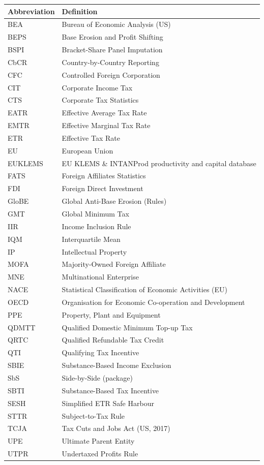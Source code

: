\documentclass[11pt,a4paper]{article}
\begin{document}
\begin{tabular}{@{}ll@{}}
  \toprule
  \textbf{Abbreviation} & \textbf{Definition} \\
  \midrule
  BEA & Bureau of Economic Analysis (US) \\
  BEPS & Base Erosion and Profit Shifting \\
  BSPI & Bracket-Share Panel Imputation \\
  CbCR & Country-by-Country Reporting \\
  CFC & Controlled Foreign Corporation \\
  CIT & Corporate Income Tax \\
  CTS & Corporate Tax Statistics \\
  EATR & Effective Average Tax Rate \\
  EMTR & Effective Marginal Tax Rate \\
  ETR & Effective Tax Rate \\
  EU & European Union \\
  EUKLEMS & EU KLEMS \& INTANProd productivity and capital database \\
  FATS & Foreign Affiliates Statistics \\
  FDI & Foreign Direct Investment \\
  GloBE & Global Anti-Base Erosion (Rules) \\
  GMT & Global Minimum Tax \\
  IIR & Income Inclusion Rule \\
  IQM & Interquartile Mean \\
  IP & Intellectual Property \\
  MOFA & Majority-Owned Foreign Affiliate \\
  MNE & Multinational Enterprise \\
  NACE & Statistical Classification of Economic Activities (EU) \\
  OECD & Organisation for Economic Co-operation and Development \\
  PPE & Property, Plant and Equipment \\
  QDMTT & Qualified Domestic Minimum Top-up Tax \\
  QRTC & Qualified Refundable Tax Credit \\
  QTI & Qualifying Tax Incentive \\
  SBIE & Substance-Based Income Exclusion \\
  SbS & Side-by-Side (package) \\
  SBTI & Substance-Based Tax Incentive \\
  SESH & Simplified ETR Safe Harbour \\
  STTR & Subject-to-Tax Rule \\
  TCJA & Tax Cuts and Jobs Act (US, 2017) \\
  UPE & Ultimate Parent Entity \\
  UTPR & Undertaxed Profits Rule \\
  \bottomrule
\end{tabular}
\end{document}
